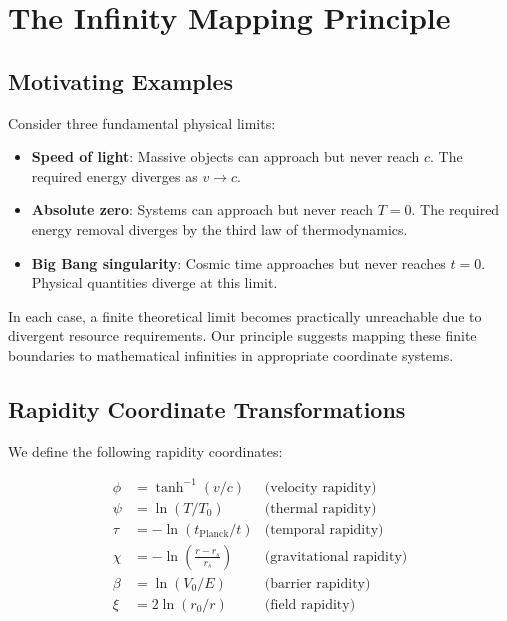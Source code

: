 \documentclass[12pt,a4paper]{article}
\begin{document}
\section{The Infinity Mapping Principle}

\subsection{Motivating Examples}

Consider three fundamental physical limits:
\begin{itemize}
    \item \textbf{Speed of light}: Massive objects can approach but never reach 
                                   $c$. The required energy diverges as $v \to c$.
    \item \textbf{Absolute zero}: Systems can approach but never reach $T = 0$. 
                                  The required energy removal diverges by the 
                                  third law of thermodynamics.
    \item \textbf{Big Bang singularity}: Cosmic time approaches but never reaches 
                                         $t = 0$. Physical quantities diverge at 
                                         this limit.
\end{itemize}

In each case, a finite theoretical limit becomes practically unreachable due to 
divergent resource requirements. Our principle suggests mapping these finite 
boundaries to mathematical infinities in appropriate coordinate systems.

\subsection{Rapidity Coordinate Transformations}

We define the following rapidity coordinates:

\begin{align}
\phi  & = \tanh ^ { - 1 } ( v / c )             & \text{(velocity rapidity)}        \\
\psi  & = \ln ( T / T _ { 0 } )                 & \text{(thermal rapidity)}         \\
\tau  & = - \ln ( t _ { \text{Planck} } / t )   & \text{(temporal rapidity)}        \\
\chi  & = - \ln \left( \frac { r - r _ { s } } { r _ { s } } \right) & \text{(gravitational rapidity)}  \\
\beta & = \ln ( V _ { 0 } / E )                 & \text{(barrier rapidity)}         \\
\xi   & = 2 \ln ( r _ { 0 } / r )               & \text{(field rapidity)}
\end{align}
\end{document}
